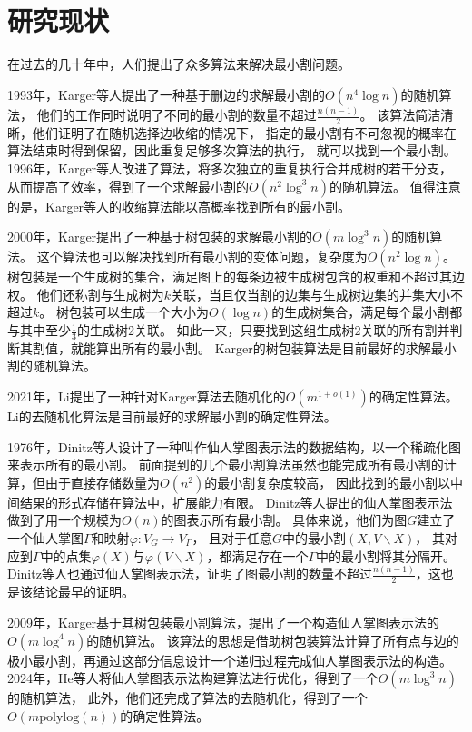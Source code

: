 \section{研究现状}

在过去的几十年中，人们提出了众多算法来解决最小割问题。

1993年，Karger等人提出了一种基于删边的求解最小割的$O(n^4\log n)$的随机算法，
他们的工作同时说明了不同的最小割的数量不超过$\frac{n(n-1)}2$。\cite{karger1993global}
该算法简洁清晰，他们证明了在随机选择边收缩的情况下，
指定的最小割有不可忽视的概率在算法结束时得到保留，因此重复足够多次算法的执行，
就可以找到一个最小割。1996年，Karger等人改进了算法，将多次独立的重复执行合并成树的若干分支，
从而提高了效率，得到了一个求解最小割的$O(n^2\log^3 n)$的随机算法。\cite{karger1996new}
值得注意的是，Karger等人的收缩算法能以高概率找到所有的最小割。

2000年，Karger提出了一种基于树包装的求解最小割的$ O(m\log^3n)$的随机算法。\cite{karger2000minimum}
这个算法也可以解决找到所有最小割的变体问题，复杂度为$O(n^2\log n)$。
树包装是一个生成树的集合，满足图上的每条边被生成树包含的权重和不超过其边权。
他们还称割与生成树为$k$关联，当且仅当割的边集与生成树边集的并集大小不超过$k$。
树包装可以生成一个大小为$O(\log n)$的生成树集合，满足每个最小割都与其中至少$\frac13$的生成树$2$关联。
如此一来，只要找到这组生成树$2$关联的所有割并判断其割值，就能算出所有的最小割。
Karger的树包装算法是目前最好的求解最小割的随机算法。

2021年，Li提出了一种针对Karger算法去随机化的$O(m^{1+o(1)})$的确定性算法。\cite{li2021deterministic}
Li的去随机化算法是目前最好的求解最小割的确定性算法。

1976年，Dinitz等人设计了一种叫作仙人掌图表示法的数据结构，以一个稀疏化图来表示所有的最小割。\cite{dinitz1976structure}\cite{fleiner2009quick}
前面提到的几个最小割算法虽然也能完成所有最小割的计算，但由于直接存储数量为$O(n^2)$的最小割复杂度较高，
因此找到的最小割以中间结果的形式存储在算法中，扩展能力有限。
Dinitz等人提出的仙人掌图表示法做到了用一个规模为$O(n)$的图表示所有最小割。
具体来说，他们为图$G$建立了一个仙人掌图$\Gamma$和映射$\varphi:V_G\rightarrow V_\Gamma$，
且对于任意$G$中的最小割$(X,V\backslash X)$，
其对应到$\Gamma$中的点集$\varphi(X)$与$\varphi(V\backslash X)$，都满足存在一个$\Gamma$中的最小割将其分隔开。
Dinitz等人也通过仙人掌图表示法，证明了图最小割的数量不超过$\frac{n(n-1)}2$，这也是该结论最早的证明。

2009年，Karger基于其树包装最小割算法，提出了一个构造仙人掌图表示法的$O(m\log^4n)$的随机算法。\cite{karger2009near}
该算法的思想是借助树包装算法计算了所有点与边的极小最小割，再通过这部分信息设计一个递归过程完成仙人掌图表示法的构造。
2024年，He等人将仙人掌图表示法构建算法进行优化，得到了一个$O(m\log^3n)$的随机算法，
此外，他们还完成了算法的去随机化，得到了一个$O(m\text{polylog}(n))$的确定性算法。\cite{he2024cactus}


